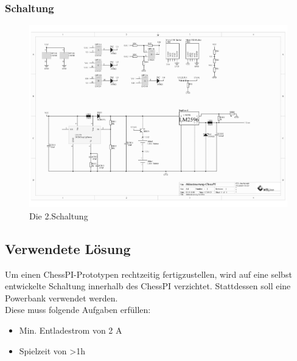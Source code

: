 \documentclass[12pt,a4paper]{article}
\begin{document}
\subsubsection{Schaltung}
\label{SUBSUBSEC:CIRCUIT-2}
\begin{figure}[H]
  \centering
		\includegraphics[scale=0.7, angle=90]{graphics/20171104-shematics.pdf}
		\caption{Die 2.Schaltung}
		\label{fig:circuit2}
\end{figure}

\newpage
\subsection{Verwendete Lösung}
\label{SUBSEC:POWERBANK}

Um einen ChessPI-Prototypen rechtzeitig fertigzustellen, wird auf eine selbst entwickelte Schaltung innerhalb des ChessPI verzichtet. Stattdessen soll eine Powerbank verwendet werden. \\
Diese muss folgende Aufgaben erfüllen:
\begin{itemize}
	\item{Min. Entladestrom von 2 A}
	\item{Spielzeit von >1h}
\end{itemize}
\end{document}
